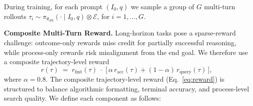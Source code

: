 During training, for each prompt $(I_0, q)$ we sample a group of $G$ multi-turn rollouts $\tau_i \sim \pi_{\theta_{\text{old}}}(\cdot \mid I_0, q) \otimes \mathcal{E}$, for $i=1,\dots,G$.

\textbf{Composite Multi-Turn Reward.}
Long-horizon tasks pose a sparse-reward challenge: outcome-only rewards miss credit for partially successful reasoning, while process-only rewards risk misalignment from the end goal. We therefore use a composite trajectory-level reward
\begin{equation}
  r(\tau) \;=\; r_{\text{fmt}}(\tau) \;\cdot\; \bigl[\,\alpha\, r_{\text{acc}}(\tau) + (1{-}\alpha)\, r_{\text{query}}(\tau)\,\bigr],
  \label{eq:reward}
\end{equation}
where $\alpha=0.8$. The composite trajectory-level reward (Eq.~\ref{eq:reward}) is structured to balance algorithmic formatting, terminal accuracy, and process-level search quality. We define each component as follows:

